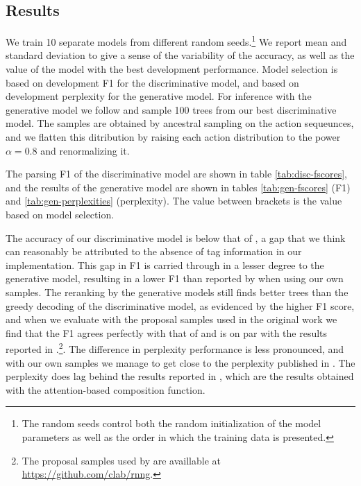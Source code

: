   \subsection{Results}
    We train 10 separate models from different random seeds.\footnote{The random seeds control both the random initialization of the model parameters as well as the order in which the training data is presented.} We report mean and standard deviation to give a sense of the variability of the accuracy, as well as the value of the model with the best development performance. Model selection is based on development F1 for the discriminative model, and based on development perplexity for the generative model. For inference with the generative model we follow \citet{dyer2016rnng} and sample 100 trees from our best discriminative model. The samples are obtained by ancestral sampling on the action sequeunces, and we flatten this ditribution by raising each action distribution to the power $\alpha = 0.8$ and renormalizing it.

    The parsing F1 of the discriminative model are shown in table \ref{tab:disc-fscores}, and the results of the generative model are shown in tables \ref{tab:gen-fscores} (F1) and \ref{tab:gen-perplexities} (perplexity). The value between brackets is the value based on model selection.

    

    

    

    The accuracy of our discriminative model is below that of \citet{dyer2016rnng}, a gap that we think can reasonably be attributed to the absence of tag information in our implementation. This gap in F1 is carried through in a lesser degree to the generative model, resulting in a lower F1 than reported by \citet{dyer2016rnng} when using our own samples. The reranking by the generative models still finds better trees than the greedy decoding of the discriminative model, as evidenced by the higher F1 score, and when we evaluate with the proposal samples used in the original work we find that the F1 agrees perfectly with that of \citet{dyer2016rnng} and is on par with the results reported in \citet{kuncoro2017syntax}.\footnote{The proposal samples used by \citet{dyer2016rnng} are availlable at \url{https://github.com/clab/rnng}.}. The difference in perplexity performance is less pronounced, and with our own samples we manage to get close to the perplexity published in \citet{dyer2016rnng}. The perplexity does lag behind the results reported in \citet{kuncoro2017syntax}, which are the results obtained with the attention-based composition function.

